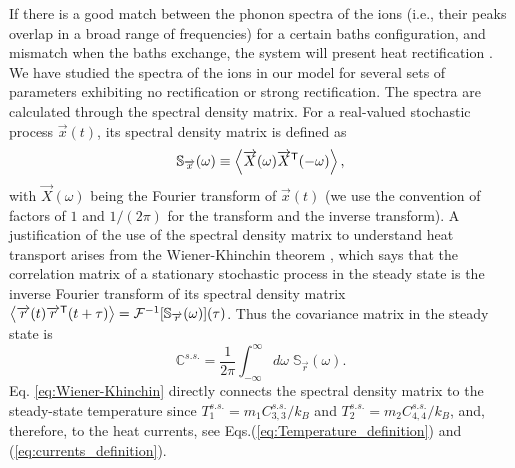 If there is a good match between the phonon spectra of the ions (i.e., their peaks overlap in a broad range of frequencies) for a certain baths configuration, and mismatch when the baths exchange, the system will present heat rectification \cite{Terraneo2002,Li2004}.
We have studied the spectra of the ions in our model for several sets of parameters exhibiting no rectification or strong rectification. The spectra are calculated  through the spectral density matrix. For a real-valued stochastic process $\overrightarrow{x}(t)$, its spectral density matrix is defined as \cite{Sarkka2019}
%
\begin{equation}
  \mathbb{S}_{\overrightarrow{x}}(\omega) \equiv \expval{ \overrightarrow{X}(\omega) \overrightarrow{X}^\mathsf{T}(-\omega) },
  \label{eq:SpectralDensityDefinition}
\end{equation}
%
with $\overrightarrow{X}(\omega)$ being the Fourier transform of $\overrightarrow{x}(t)$ (we use the convention of factors of $1$ and ${1}/{(2\pi)}$ for the transform and the inverse transform). A justification of the use of the spectral density matrix to understand heat transport arises from the Wiener-Khinchin theorem \cite{Sarkka2019}, which says that the correlation matrix of a stationary stochastic process in the steady state is the inverse Fourier transform of its spectral density matrix $\expval{\overrightarrow{r}(t)\overrightarrow{r}^\mathsf{T}(t+\tau)} = \mathcal{F}^{-1}[\mathbb{S}_{\overrightarrow{r}}(\omega)](\tau)$. Thus  the covariance matrix in the steady state is
%
\begin{equation}
  \mathbb{C}^{s.s.} = \frac{1}{2\pi} \int_{-\infty}^{\infty}d\omega\;\mathbb{S}_{\overrightarrow{r}}(\omega).
  \label{eq:Wiener-Khinchin}
\end{equation}
%
Eq. \eqref{eq:Wiener-Khinchin} directly connects the spectral density matrix to the steady-state temperature
since  $T_1^{s.s.} = {m_1 C_{3,3}^{s.s.}}/{k_B}$ and $T_2^{s.s.} = {m_2 C_{4,4}^{s.s.}}/{k_B}$, and, therefore, to the heat currents,
see  Eqs.(\ref{eq:Temperature_definition}) and (\ref{eq:currents_definition}).


